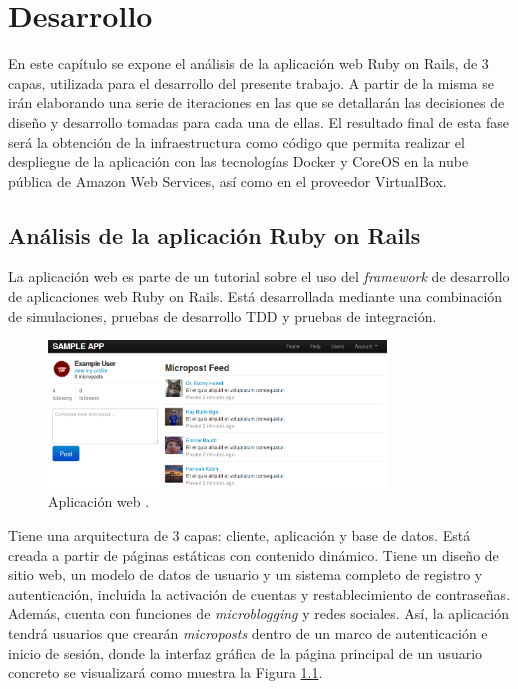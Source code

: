 \chapter{Desarrollo}
\label{cha:development}

En este capítulo se expone el análisis de la aplicación web Ruby on Rails, de 3 capas, utilizada para el desarrollo del presente trabajo. A partir de la misma se irán elaborando una serie de iteraciones en las que se detallarán las decisiones de diseño y desarrollo tomadas para cada una de ellas. El resultado final de esta fase será la obtención de la infraestructura como código que permita realizar el despliegue de la aplicación con las tecnologías Docker y CoreOS en la nube pública de Amazon Web Services, así como en el proveedor VirtualBox.

\section{Análisis de la aplicación Ruby on Rails}

La aplicación web  es parte de un tutorial\cite{rubytutorial} sobre el uso del \textit{framework} de desarrollo de aplicaciones web Ruby on Rails. Está desarrollada mediante una combinación de simulaciones, pruebas de desarrollo TDD y pruebas de integración. 

\begin{figure}[H]
\centering
\includegraphics[width=0.8\textwidth]{images/figures/sampleapp.png}
\caption{Aplicación web . \label{fig:sampleapp}}
\end{figure}

Tiene una arquitectura de 3 capas: cliente, aplicación y base de datos. Está creada a partir de páginas estáticas con contenido dinámico. Tiene un diseño de sitio web, un modelo de datos de usuario y un sistema completo de registro y autenticación, incluida la activación de cuentas y restablecimiento de contraseñas. Además, cuenta con funciones de \textit{microblogging} y redes sociales. Así, la aplicación tendrá usuarios que crearán \textit{microposts} dentro de un marco de autenticación e inicio de sesión, donde la interfaz gráfica de la página principal de un usuario concreto se visualizará como muestra la Figura \ref{fig:sampleapp}.

